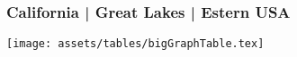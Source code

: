\begin{frame}
    \frametitle{California | Great Lakes | Estern USA}

    \texttt{[image: assets/tables/bigGraphTable.tex]}

\end{frame}